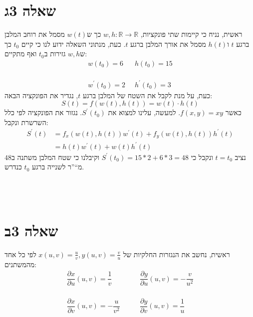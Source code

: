 \documentclass[11pt, oneside]{article}
\newcommand{\qed}{\R{$\blacksquare$}}
\newcommand{\br}{\\\\\\\\}
\newcommand{\mR}{\mathbb{R}}
\newcommand{\pdd}[2]{\dfrac{\partial #1}{\partial #2}}
\begin{document}
\section*{שאלה 3ג}
ראשית, נניח כי קיימות שתי פונקציות, $w, h : \mR \to \mR$ כך ש$w(t)$ מסמל את רוחב המלבן ברגע $t$ ו$h(t)$ מסמל את אורך המלבן ברגע $t$. כעת, מנתוני השאלה ידוע לנו כי קיים $t_{0}$ כך ש$w, h$ גזירות ב$t_{0}$ ואף מתקיים:
\[
\begin{matrix}
w(t_{0}) = 6 \;&\; h(t_{0}) = 15\br
w^{\prime}(t_{0}) = 2 \;&\; h^{\prime}(t_{0}) = 3
\end{matrix}
\]
כעת, על מנת לקבל את השטח של המלבן ברגע $t$, נגדיר את הפונקציה הבאה:
\[
S(t) = f(w(t), h(t)) = w(t) \cdot h(t)
\]
כאשר $f(x, y) = xy$. למעשה, עלינו למצוא את $S^{\prime}(t_{0})$. נגזור את הפונקציה לפי כלל השרשרת ונקבל:
\begin{align*}
S^{\prime}(t)
&= f_{x}(w(t), h(t))w^{\prime}(t) + f_{y}(w(t), h(t))h^{\prime}(t)\\
&= h(t)w^{\prime}(t) + w(t)h^{\prime}(t)
\end{align*}
נציב $t = t_{0}$ ונקבל כי $S^{\prime}(t_{0}) = 15 * 2 + 6 * 3 = 48$ וקיבלנו כי שטח המלבן משתנה ב$48$ מ``''ר לשנייה ברגע $t_{0}$ כנדרש.
\br\qed
\clearpage

\section*{שאלה 3ב}
ראשית, נחשב את הנגזרות החלקיות של $x(u, v) = \frac{u}{v}, y(u, v) = \frac{v}{u}$ לפי כל אחד מהמשתנים:
\[
\begin{matrix}
\pdd{x}{u}(u, v) = \dfrac{1}{v} \quad&\quad \pdd{y}{u}(u, v) = -\dfrac{v}{u^{2}}\br
\pdd{x}{v}(u, v) = -\dfrac{u}{v^{2}} \quad&\quad \pdd{y}{v}(u, v) = \dfrac{1}{u}
\end{matrix}
\]
\end{document}
